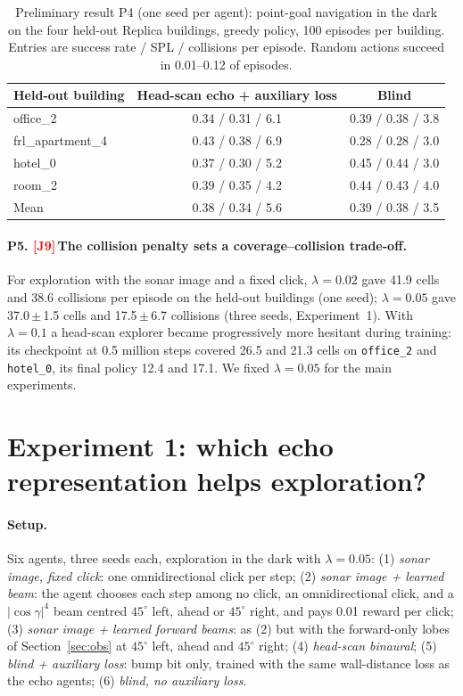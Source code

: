 \documentclass[10pt]{article}
\newif\ifreview \ifdefined\REVIEWMODE \reviewtrue \fi
\newcommand{\J}[1]{\ifreview\textcolor{red}{\textbf{[J#1]}}\,\fi}   %
\newcommand{\pmsd}[2]{#1\,{\scriptsize$\pm$\,#2}}
\begin{document}
\begin{table}[t]
\caption{Preliminary result P4 (one seed per agent): point-goal navigation in the dark on the four held-out Replica buildings, greedy policy, 100 episodes per building. Entries are success rate / SPL / collisions per episode. Random actions succeed in 0.01--0.12 of episodes.}
\label{tab:pointgoal}
\centering\small
\begin{tabular}{lcc}
\toprule
Held-out building & Head-scan echo + auxiliary loss & Blind \\
\midrule
office\_2 & 0.34 / 0.31 / 6.1 & 0.39 / 0.38 / 3.8 \\
frl\_apartment\_4 & 0.43 / 0.38 / 6.9 & 0.28 / 0.28 / 3.0 \\
hotel\_0 & 0.37 / 0.30 / 5.2 & 0.45 / 0.44 / 3.0 \\
room\_2 & 0.39 / 0.35 / 4.2 & 0.44 / 0.43 / 4.0 \\
\midrule
Mean & 0.38 / 0.34 / 5.6 & 0.39 / 0.38 / 3.5 \\
\bottomrule
\end{tabular}
\end{table}

\paragraph{P5. \J{9}The collision penalty sets a coverage--collision trade-off.} For exploration with the sonar image and a fixed click, $\lambda=0.02$ gave 41.9 cells and 38.6 collisions per episode on the held-out buildings (one seed); $\lambda=0.05$ gave \pmsd{37.0}{1.5} cells and \pmsd{17.5}{6.7} collisions (three seeds, Experiment~1). With $\lambda=0.1$ a head-scan explorer became progressively more hesitant during training: its checkpoint at 0.5 million steps covered 26.5 and 21.3 cells on \texttt{office\_2} and \texttt{hotel\_0}, its final policy 12.4 and 17.1. We fixed $\lambda=0.05$ for the main experiments.

\section{Experiment 1: which echo representation helps exploration?}
\label{sec:exp1}

\paragraph{Setup.} Six agents, three seeds each, exploration in the dark with $\lambda=0.05$: (1) \emph{sonar image, fixed click}: one omnidirectional click per step; (2) \emph{sonar image + learned beam}: the agent chooses each step among no click, an omnidirectional click, and a $|\cos\gamma|^4$ beam centred $45^\circ$ left, ahead or $45^\circ$ right, and pays 0.01 reward per click; (3) \emph{sonar image + learned forward beams}: as (2) but with the forward-only lobes of Section~\ref{sec:obs} at $45^\circ$ left, ahead and $45^\circ$ right; (4) \emph{head-scan binaural}; (5) \emph{blind + auxiliary loss}: bump bit only, trained with the same wall-distance loss as the echo agents; (6) \emph{blind, no auxiliary loss}.
\end{document}
